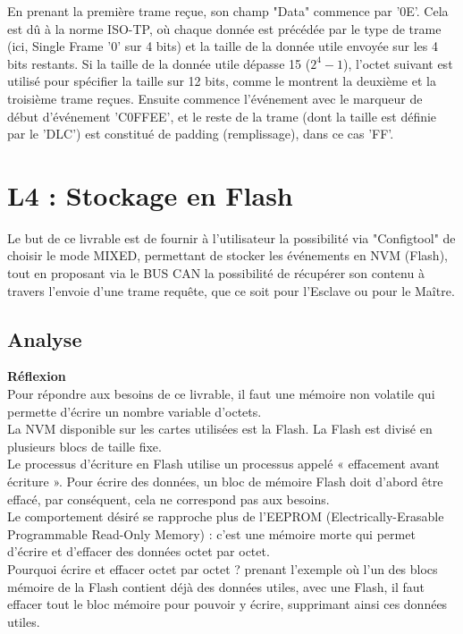 \documentclass[a4paper, 12pt]{report}
\begin{document}
En prenant la première trame reçue, son champ "Data" commence par '0E'. Cela est dû à la norme ISO-TP, où chaque donnée est précédée par le type de trame (ici, Single Frame '0' sur 4 bits) et la taille de la donnée utile envoyée sur les 4 bits restants. Si la taille de la donnée utile dépasse 15 ($2^4 - 1$), l'octet suivant est utilisé pour spécifier la taille sur 12 bits, comme le montrent la deuxième et la troisième trame reçues. Ensuite commence l'événement avec le marqueur de début d'événement 'C0FFEE', et le reste de la trame (dont la taille est définie par le '\ac{DLC}') est constitué de padding (remplissage), dans ce cas 'FF'.

\section{L4 : Stockage en Flash}
Le but de ce livrable est de fournir à l'utilisateur la possibilité via "Configtool" de choisir le mode MIXED, permettant de stocker les événements en \ac{NVM} (Flash), tout en proposant via le BUS CAN la possibilité de récupérer son contenu à travers l'envoie d'une trame requête, que ce soit pour l'Esclave ou pour le Maître.

\subsection{Analyse}
\textbf{Réflexion}\\
Pour répondre aux besoins de ce livrable, il faut une mémoire non volatile qui permette d'écrire un nombre variable d'octets.\\
La NVM disponible sur les cartes utilisées est la Flash. La Flash est divisé en plusieurs blocs de taille fixe.\\
Le processus d'écriture en Flash utilise un processus appelé « effacement avant écriture ». Pour écrire des données, un bloc de mémoire Flash doit d'abord être effacé, par conséquent, cela ne correspond pas aux besoins.\\
Le comportement désiré se rapproche plus de l'\acs{EEPROM} (Electrically-Erasable Programmable Read-Only Memory) : c'est une mémoire morte qui permet d'écrire et d'effacer des données octet par octet.\\
Pourquoi écrire et effacer octet par octet ? prenant l'exemple où l'un des blocs mémoire de la Flash contient déjà des données utiles, avec une Flash, il faut effacer tout le bloc mémoire pour pouvoir y écrire, supprimant ainsi ces données utiles.
\end{document}
